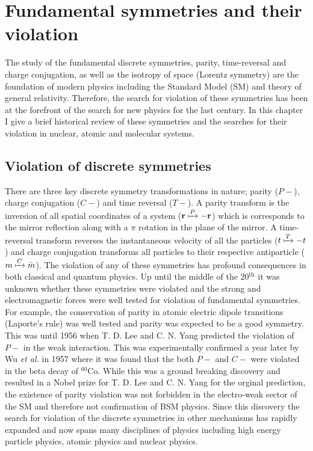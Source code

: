 \documentclass[10pt,a4paper, twoside, openright]{report}
\begin{document}
\chapter{Fundamental symmetries and their violation} \label{chap:Violation}
The study of the fundamental discrete symmetries, parity, time-reversal and charge conjugation, as well as the isotropy of space (Lorentz symmetry) are the foundation of modern physics including the Standard Model (SM) and theory of general relativity. Therefore, the search for violation of these symmetries has been at the forefront of the search for new physics for the last century. In this chapter I give a brief historical review of these symmetries and the searches for their violation in nuclear, atomic and molecular systems. 

\section{Violation of discrete symmetries}
There are three key discrete symmetry transformations in nature; parity ($P-$), charge conjugation ($C-$) and time reversal ($T-$). A parity transform is the inversion of all spatial coordinates of a system ($\textbf{r} \xmapsto{P} -\textbf{r}$) which is corresponds to the mirror reflection along with a $\pi$ rotation in the plane of the mirror. A time-reversal transform reverses the instantaneous velocity of all the particles ($t \xmapsto{T} -t$) and charge conjugation transforms all particles to their respective antiparticle ($m \xmapsto{C} \bar{m}$). The violation of any of these symmetries has profound consequences in both classical and quantum physics. Up until the middle of the 20$^{\text{th}}$ it was unknown whether these symmetries were violated and the strong and electromagnetic forces were well tested for violation of fundamental symmetries.  For example, the conservation of parity in atomic electric dipole transitions (Laporte's rule) was well tested and parity was expected to be a good symmetry. This was until 1956 when T. D. Lee and C. N. Yang predicted the violation of $P-$ in the weak interaction\cite{Yang1956}.  This was experimentally confirmed a year later  by Wu \textit{et al.} in 1957 \cite{Wu1957} where it was found that the both $P-$ and $C-$ were violated in the beta decay of $^{60}$Co. While this was a ground breaking discovery and resulted in a Nobel prize for  T. D. Lee and C. N. Yang for the orginal prediction, the existence of parity violation was not forbidden in the electro-weak sector of the SM and therefore not confirmation of BSM physics.   Since this discovery the search for violation of the discrete symmetries in other mechanisms has rapidly expanded and now spans many disciplines of physics including high energy particle physics, atomic physics and nuclear physics. \\
\end{document}
